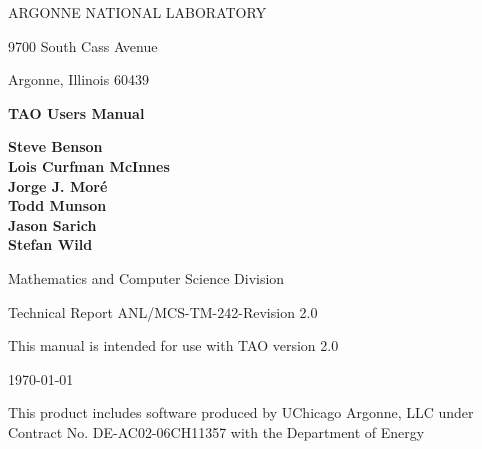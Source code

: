 
\vspace{1.75in}

\begin{center}

ARGONNE NATIONAL LABORATORY

9700 South Cass Avenue

Argonne, Illinois  60439

\vspace{1.5in}

{\Large
{\bf 
TAO Users Manual
}
}

\vspace{.5in}

{\bf Steve Benson \\ Lois Curfman McInnes \\ Jorge J. Mor\'e \\ Todd Munson \\ Jason Sarich \\ Stefan Wild}

\vspace{.5in}

Mathematics and Computer Science Division

\vspace{.25in}

Technical Report  ANL/MCS-TM-242-Revision 2.0

\vspace{.25in}

This manual is intended for use with TAO version 2.0

\vspace{1.0in}

\today
\end{center}

\vspace{0.75in}

\par\noindent
This product includes software produced by UChicago Argonne, LLC under 
Contract No. DE-AC02-06CH11357 with the Department of Energy
